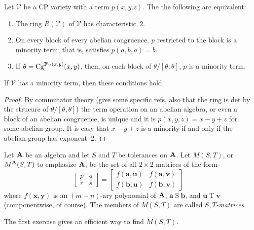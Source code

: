   \begin{lemma}
  Let $\mathcal V$ be a CP variety with a \malcev term $p(x,y.z)$.
  The the following are equivalent:
  \begin{enumerate}
  \item
  The ring $R(\mathcal V)$ of $\mathcal V$ has characteristic~2.
  \item
  On every block of every abelian congruence, $p$ restricted to the
  block is a minority term; that is, satisfies $p(a,b,a) = b$.
  \item
  If $\theta = \textup{Cg}^{\mathbf{F}_{\mathcal V}(x,y)}(x,y)$, then,
  on each block of $\theta/[\theta,\theta]$, $p$ is a minority term.
  \end{enumerate}
  If $\mathcal V$ has a minority term, then these conditions hold.
  \end{lemma}
  
  \begin{proof}
  By commutator theory (give some specific refs, also that the ring
  is det by the strucure of $\theta/[\theta,\theta]$)
  the \malcev term operation on an
  abelian algebra, or even a block of an abelian congruence,
  is unique and it is $p(x,y,z) = x - y + z$ for
  some abelian group. It is easy that $x - y + z$ is a minority
  if and only if the abelian group has exponent~2.
  \end{proof}
  
  
  
  Let $\mathbf{A}$ be an algebra and let $S$ and $T$ be tolerances
  on $\mathbf{A}$.
  Let $M(S,T)$, or $M^{\mathbf{A}}(S,T)$ to emphasize $\mathbf{A}$,
  be the set of all $2 \times 2$ matrices of the form
  \begin{equation}\label{eq1}
  \begin{bmatrix}
  p&q\\
  r&s
  \end{bmatrix}
  =
  \begin{bmatrix}
  f(\mathbf{a},\mathbf{u})&f(\mathbf{a},\mathbf{v})\\
  f(\mathbf{b},\mathbf{u})&f(\mathbf{b},\mathbf{v})
  \end{bmatrix}
  \end{equation}
  where $f(\mathbf{x},\mathbf{y})$ is an $(m+n)$-ary polynomial of
  $\mathbf{A}$, $\mathbf{a} \mathrel{S} \mathbf{b}$, and
  $\mathbf{u} \mathrel{T} \mathbf{v}$
  (componentwise, of course). The members of $M(S,T)$ are called
  \emph{$S,T$-matrices}.
  
  The first exercise gives an efficient way to find $M(S,T)$.
  
